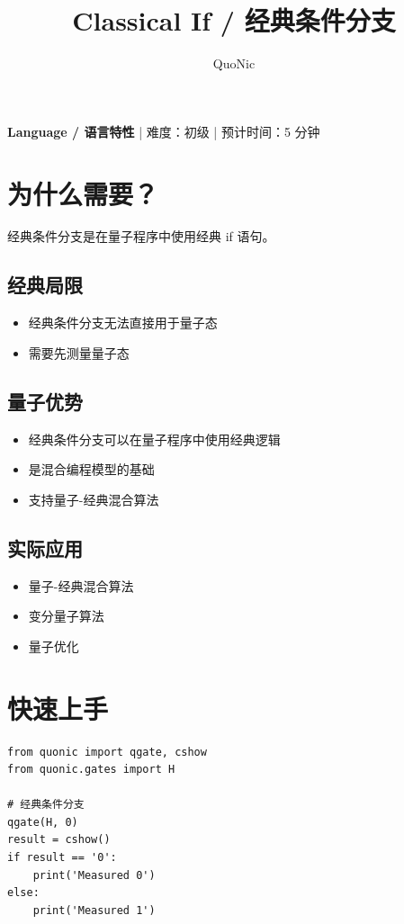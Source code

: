 \documentclass[12pt,a4paper]{article}
\title{Classical If / 经典条件分支}
\author{QuoNic}
\date{}
\begin{document}
\maketitle

\begin{center}
\textbf{Language / 语言特性} | 难度：初级 | 预计时间：5 分钟
\end{center}

\tableofcontents
\newpage

\section{为什么需要？}

经典条件分支是在量子程序中使用经典 if 语句。

\subsection{经典局限}
\begin{itemize}
  \item 经典条件分支无法直接用于量子态
  \item 需要先测量量子态
\end{itemize}

\subsection{量子优势}
\begin{itemize}
  \item 经典条件分支可以在量子程序中使用经典逻辑
  \item 是混合编程模型的基础
  \item 支持量子-经典混合算法
\end{itemize}

\subsection{实际应用}
\begin{itemize}
  \item 量子-经典混合算法
  \item 变分量子算法
  \item 量子优化
\end{itemize}

\section{快速上手}

\begin{verbatim}
from quonic import qgate, cshow
from quonic.gates import H

# 经典条件分支
qgate(H, 0)
result = cshow()
if result == '0':
    print('Measured 0')
else:
    print('Measured 1')
\end{verbatim}
\end{document}
